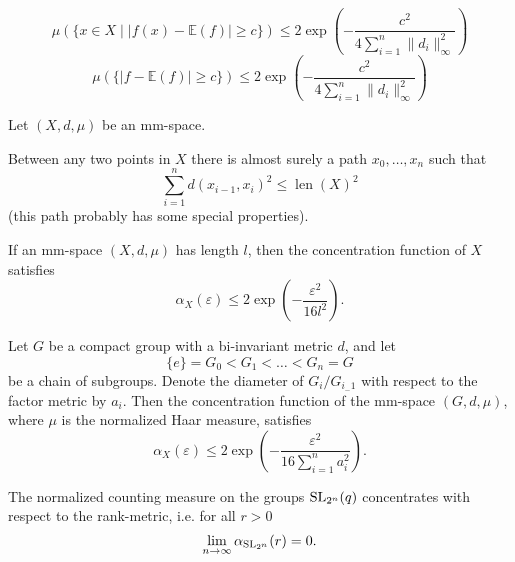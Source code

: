 \begin{lemma}
\[\mu(\{x\in X\mid |f(x)-\mathbb{E}(f)|\geq c\})\leq 2\exp\left(-\frac{c^2}{4\sum_{i=1}^{n}\|d_i\|^2_\infty}\right)\]
\[\mu(\{|f-\mathbb{E}(f)|\geq c\})\leq 2\exp\left(-\frac{c^2}{4\sum_{i=1}^{n}\|d_i\|^2_\infty}\right)\]
\end{lemma}

\begin{definition}\label{def:length}
Let $(X,d,\mu)$ be an mm-space.
\end{definition}

Between any two points in $X$ there is almost surely a path $x_0,\dots,x_n$ such that \[\sum_{i=1}^n d(x_{i-1},x_i)^2\leq \operatorname{len}(X)^2\] (this path probably has some special properties).

\begin{theorem}
If an mm-space $(X,d,\mu)$ has length $l$, then the concentration function of $X$ satisfies
\[\alpha_X(\varepsilon)\leq 2\exp\left(-\frac{\varepsilon^2}{16l^2}\right).\]
\end{theorem}


\begin{theorem}
Let $G$ be a compact group with a bi-invariant metric $d$, and let
\[\{e\}=G_0<G_1<\dots <G_n=G\]
be a chain of subgroups. Denote the diameter of $G_i/G_{i_-1}$ with respect to the factor metric by $a_i$. Then the concentration function of the mm-space $(G,d,\mu)$, where $\mu$ is the normalized Haar measure, satisfies
\[\alpha_X(\varepsilon)\leq 2\exp\left(-\frac{\varepsilon^2}{16\sum_{i=1}^{n}a_i^2}\right).\]
\end{theorem}

\begin{theorem}
The normalized counting measure on the groups $\operatorname{SL}_{2^n}(q)$ concentrates with respect to the rank-metric, i.e. for all $r>0$
\[\lim_{n\to\infty} \alpha_{\operatorname{SL}_{2^n}}(r)=0 .\]
\end{theorem}


